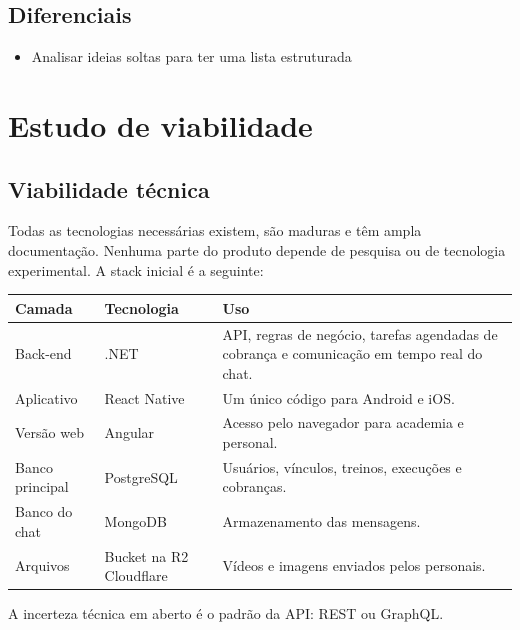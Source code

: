 \subsection{Diferenciais}
\begin{itemize}
  \item Analisar ideias soltas para ter uma lista estruturada
\end{itemize}

\section{Estudo de viabilidade}

\subsection{Viabilidade técnica}

Todas as tecnologias necessárias existem, são maduras e têm ampla documentação. Nenhuma parte do produto depende de pesquisa ou de tecnologia experimental. A stack inicial é a seguinte:

\begin{tabularx}{\textwidth}{@{}l l L@{}}
  \toprule
  \textbf{Camada} & \textbf{Tecnologia} & \textbf{Uso} \\
  \midrule
  Back-end        & .NET          & API, regras de negócio, tarefas agendadas de cobrança e comunicação em tempo real do chat. \\
  Aplicativo      & React Native  & Um único código para Android e iOS. \\
  Versão web      & Angular       & Acesso pelo navegador para academia e personal. \\
  Banco principal & PostgreSQL    & Usuários, vínculos, treinos, execuções e cobranças. \\
  Banco do chat   & MongoDB       & Armazenamento das mensagens. \\
  Arquivos        & Bucket na R2 Cloudflare & Vídeos e imagens enviados pelos personais. \\
  \bottomrule
\end{tabularx}

A incerteza técnica em aberto é o padrão da API: REST ou GraphQL.

